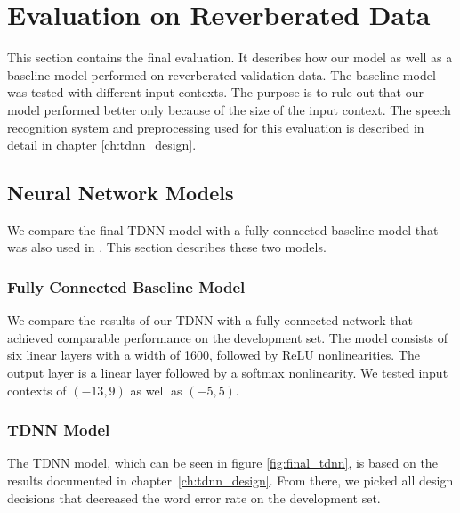 
\chapter{Evaluation on Reverberated Data}
\label{ch:results}
This section contains the final evaluation. It describes how our model as well as a baseline model performed on reverberated validation data. The baseline model was tested with different input contexts. The purpose is to rule out that our model performed better only because of the size of the input context. The speech recognition system and preprocessing used for this evaluation is described in detail in chapter \ref{ch:tdnn_design}.
\section{Neural Network Models}
We compare the final TDNN model with a fully connected baseline model that was also used in \cite{nguyen20162016}. This section describes these two models. 
\subsection{Fully Connected Baseline Model}
We compare the results of our TDNN with a fully connected network that achieved comparable performance on the development set. The model consists of six linear layers with a width of 1600, followed by ReLU nonlinearities. The output layer is a linear layer followed by a softmax nonlinearity. We tested input contexts of $(-13, 9)$ as well as $(-5, 5)$.
\subsection{TDNN Model}
The TDNN model, which can be seen in figure \ref{fig:final_tdnn}, is based on the results documented in chapter~\ref{ch:tdnn_design}. From there, we picked all design decisions that decreased the word error rate on the development set. \\ 

